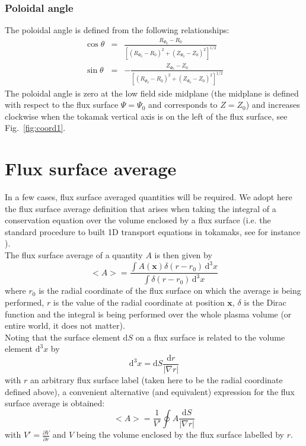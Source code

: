 \documentclass[a4paper]{report}
\begin{document}
\subsubsection{Poloidal angle}
The poloidal angle is defined from the following relationships:
\begin{eqnarray}
 \cos \theta &=& \frac{R_{\Psi_0}-R_0}{\left[ (R_{\Psi_0}-R_0)^2 + (Z_{\Psi_0}-Z_0)^2 \right]^{1/2}}\\
 \sin \theta &=& -\frac{Z_{\Psi_0}-Z_0}{\left[ (R_{\Psi_0}-R_0)^2 + (Z_{\Psi_0}-Z_0)^2 \right]^{1/2}}
\end{eqnarray}
The poloidal angle is zero at the low field side midplane (the midplane is defined with respect to the flux surface $\Psi=\Psi_0$ and corresponds to $Z=Z_0$) and increases clockwise when the tokamak vertical axis is on the left of the flux surface, see Fig.~\ref{fig:coord1}.

\section{Flux surface average}
In a few cases, flux surface averaged quantities will be required. We adopt here the flux surface average definition that arises when taking the integral of a conservation equation over the volume enclosed by a flux surface (i.e. the standard procedure to built 1D transport equations in tokamaks, see for instance \cite{Hinton:RMP1976}).\\
The flux surface average of a quantity $A$ is then given by
\begin{equation}
 <A> = \frac{\int A(\mathbf{x}) \delta(r-r_0) \,\textrm{d}^3{x}}{\int\delta(r-r_0) \,\textrm{d}^3{x}}
\end{equation}
where $r_0$ is the radial coordinate of the flux surface on which the average is being 
performed, $r$ is the value of the radial coordinate at position $\mathbf{x}$, $\delta$ is the Dirac function and the integral is being performed over the whole plasma volume (or entire world, it does not matter).  \\
Noting that the surface element $\textrm{d} S$ on a flux surface is related to the volume element 
$\textrm{d}^3x$ by
\begin{equation}
 \textrm{d}^3x = \textrm{d} S \frac{\textrm{d}r}{|\nabla r|}
\end{equation}
with $r$ an arbitrary flux surface label (taken here to be the radial coordinate defined above), a convenient alternative (and equivalent) expression for the flux surface average is obtained:
\begin{equation} 
 <A> = \frac{1}{V'} \oint A \frac{\textrm{d}S}{|\nabla r|}
\end{equation}
with $V'= \frac{\partial V}{\partial r}$ and $V$ being the volume enclosed by the flux surface labelled by $r$. 
\end{document}

